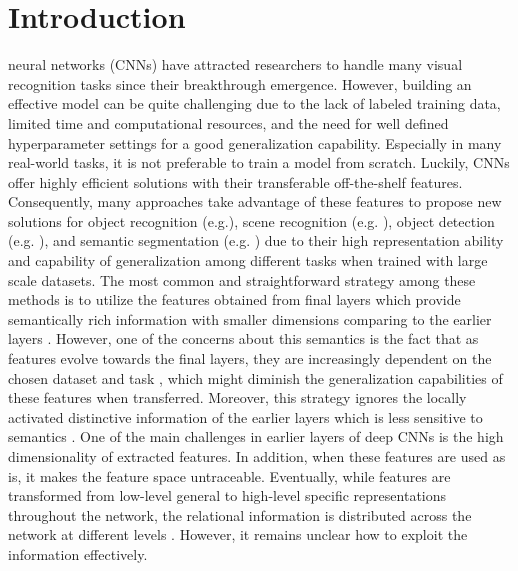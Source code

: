 \documentclass[10pt,journal,compsoc]{IEEEtran}
\begin{document}
\IEEEdisplaynontitleabstractindextext




\IEEEpeerreviewmaketitle

 
\section{Introduction}
\label{sec:intro}
 neural networks (CNNs) have attracted researchers to handle many visual recognition tasks since their breakthrough emergence. However, building an effective model can be quite challenging due to the lack of labeled training data, limited time and computational resources, and the need for well defined hyperparameter settings for a good generalization capability. Especially in many real-world tasks, it is not preferable to train a model from scratch. Luckily, CNNs offer highly efficient solutions with their transferable off-the-shelf features. Consequently, many approaches take advantage of these features to propose new solutions for object recognition (e.g.\cite{Razavian_CVPRW_2014, Schwarz_ICRA_2015}), scene recognition (e.g. \cite{Liao_ICRA_2016, Song_TIP_2019}), object detection (e.g. \cite{Girshick_CVPR_2014, Sermanet_ICLR_2014}), and semantic segmentation (e.g. \cite{Girshick_CVPR_2014, Farabet_TPAMI_2013}) due to their high representation ability and capability of generalization among different tasks when trained with large scale datasets. The most common and straightforward strategy among these methods is to utilize the features obtained from final layers which provide semantically rich information with smaller dimensions comparing to the earlier layers \cite{Razavian_CVPRW_2014, Schwarz_ICRA_2015, Girshick_CVPR_2014, Sermanet_ICLR_2014, Farabet_TPAMI_2013}. However, one of the concerns about this semantics is the fact that as features evolve towards the final layers, they are increasingly dependent on the chosen dataset and task \cite{Yosinski_NIPS_2014}, which might diminish the generalization capabilities of these features when transferred. Moreover, this strategy ignores the locally activated distinctive information of the earlier layers which is less sensitive to semantics \cite{Hariharan_CVPR_2015, Zaki_ICRA_2016}. One of the main challenges in earlier layers of deep CNNs is the high dimensionality of extracted features. In addition, when these features are used as is, it makes the feature space untraceable. Eventually, while features are transformed from low-level general to high-level specific representations throughout the network, the relational information is distributed across the network at different levels \cite{Yosinski_NIPS_2014, Hariharan_CVPR_2015}. However, it remains unclear how to exploit the information effectively.
\end{document}
